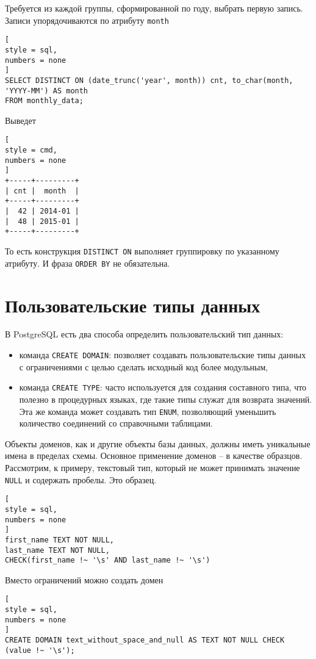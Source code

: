 \documentclass[%
	11pt,
	a4paper,
	utf8,
		]{article}
\begin{document}
Требуется из каждой группы, сформированной по году, выбрать первую запись. Записи упорядочиваются по атрибуту \texttt{month}
\begin{lstlisting}[
style = sql,
numbers = none
]
SELECT DISTINCT ON (date_trunc('year', month)) cnt, to_char(month, 'YYYY-MM') AS month 
FROM monthly_data;
\end{lstlisting}

Выведет
\begin{lstlisting}[
style = cmd,
numbers = none
]
+-----+---------+
| cnt |  month  |
+-----+---------+
|  42 | 2014-01 |
|  48 | 2015-01 |
+-----+---------+
\end{lstlisting}

То есть конструкция \texttt{DISTINCT ON} выполняет группировку по указанному атрибуту. И фраза \texttt{ORDER BY} не обязательна.

\section{Пользовательские типы данных}

В PostgreSQL есть два способа определить пользовательский тип данных:
\begin{itemize}
	\item команда \texttt{CREATE DOMAIN}: позволяет создавать пользовательские типы данных с ограничениями с целью сделать исходный код более модульным,
	
	\item команда \texttt{CREATE TYPE}: часто используется для создания составного типа, что полезно в процедурных языках, где такие типы служат для возврата значений. Эта же команда может создавать тип \texttt{ENUM}, позволяющий уменьшить количество соединений со справочными таблицами.
\end{itemize}

Объекты доменов, как и другие объекты базы данных, должны иметь уникальные имена в пределах схемы. Основное применение доменов -- в качестве образцов. Рассмотрим, к примеру, текстовый тип, который не может принимать значение \texttt{NULL} и содержать пробелы. Это образец.
\begin{lstlisting}[
style = sql,
numbers = none
]
first_name TEXT NOT NULL,
last_name TEXT NOT NULL,
CHECK(first_name !~ '\s' AND last_name !~ '\s')
\end{lstlisting}

Вместо ограничений можно создать домен
\begin{lstlisting}[
style = sql,
numbers = none
]
CREATE DOMAIN text_without_space_and_null AS TEXT NOT NULL CHECK (value !~ '\s');
\end{lstlisting}
\end{document}
